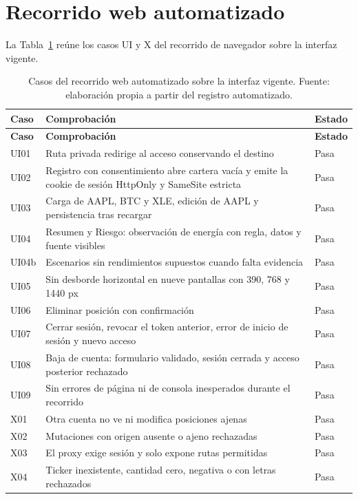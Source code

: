 \section*{Recorrido web automatizado}
La Tabla~\ref{tab:casos-web} reúne los casos UI y X del recorrido de navegador sobre la interfaz vigente.
\begin{longtable}{>{\raggedright\arraybackslash}p{}>{\raggedright\arraybackslash}p{}p{}}
\caption{Casos del recorrido web automatizado sobre la interfaz vigente. Fuente: elaboración propia a partir del registro automatizado.}\label{tab:casos-web}\\
\hline
\textbf{Caso} & \textbf{Comprobación} & \textbf{Estado}\\\hline\endfirsthead
\hline
\textbf{Caso} & \textbf{Comprobación} & \textbf{Estado}\\\hline\endhead
UI01 & Ruta privada redirige al acceso conservando el destino & Pasa \\\hline
UI02 & Registro con consentimiento abre cartera vacía y emite la cookie de sesión HttpOnly y SameSite estricta & Pasa \\\hline
UI03 & Carga de AAPL, BTC y XLE, edición de AAPL y persistencia tras recargar & Pasa \\\hline
UI04 & Resumen y Riesgo: observación de energía con regla, datos y fuente visibles & Pasa \\\hline
UI04b & Escenarios sin rendimientos supuestos cuando falta evidencia & Pasa \\\hline
UI05 & Sin desborde horizontal en nueve pantallas con 390, 768 y 1440 px & Pasa \\\hline
UI06 & Eliminar posición con confirmación & Pasa \\\hline
UI07 & Cerrar sesión, revocar el token anterior, error de inicio de sesión y nuevo acceso & Pasa \\\hline
UI08 & Baja de cuenta: formulario validado, sesión cerrada y acceso posterior rechazado & Pasa \\\hline
UI09 & Sin errores de página ni de consola inesperados durante el recorrido & Pasa \\\hline
X01 & Otra cuenta no ve ni modifica posiciones ajenas & Pasa \\\hline
X02 & Mutaciones con origen ausente o ajeno rechazadas & Pasa \\\hline
X03 & El proxy exige sesión y solo expone rutas permitidas & Pasa \\\hline
X04 & Ticker inexistente, cantidad cero, negativa o con letras rechazados & Pasa \\\hline

\end{longtable}
